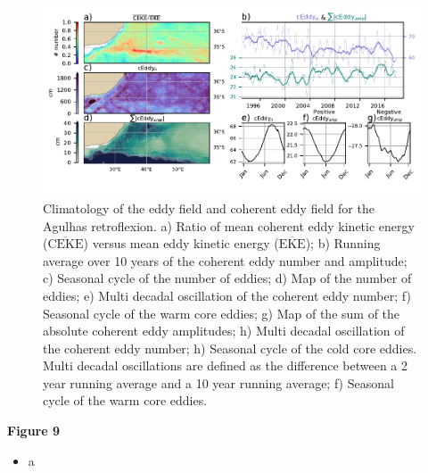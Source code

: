 \documentclass[draft,linenumbers]{agujournal2019}
\newcommand{\MEKE}{\overline{\textrm{EKE}}}
\newcommand{\MCEKE}{\overline{\textrm{CEKE}}}
\begin{document}
	\begin{figure}
	    \centering
	    \includegraphics[width=1\textwidth]{figures/regional_ratios_and_stats_V3_2.pdf}
	    \caption{Climatology of the eddy field and coherent eddy field for the Agulhas retroflexion. a) Ratio of mean coherent eddy kinetic energy ($\MCEKE$) versus mean eddy kinetic energy ($\MEKE$); b) Running average over 10 years of the coherent eddy number and amplitude; c) Seasonal cycle of the number of eddies; d) Map of the number of eddies; 
		e) Multi decadal oscillation of the coherent eddy number; f) Seasonal cycle of the warm core eddies; g) Map of the sum of the absolute coherent eddy amplitudes;  h) Multi decadal oscillation of the coherent eddy number; h) Seasonal cycle of the cold core eddies. Multi decadal oscillations are defined as the difference between a 2 year running average and a 10 year running average; f) Seasonal cycle of the warm core eddies.}
	    \label{fig:south_atlantic_cycle}
	\end{figure}

	\textbf{Figure 9}
	\begin{itemize}
		\item a
	\end{itemize}
\end{document}

